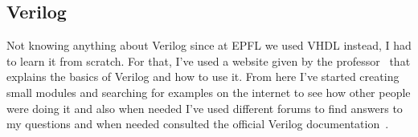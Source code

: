 \subsection{Verilog}
Not knowing anything about Verilog since at EPFL we used VHDL instead, I had to learn it from scratch.
For that, I've used a website given by the professor~\cite{verilog_tutorial} that explains the basics of Verilog and how to use it.
From here I've started creating small modules and searching for examples on the internet to see how other people were doing it
and also when needed I've used different forums to find answers to my questions and when needed consulted the official 
Verilog documentation~\cite{verilog_doc}.